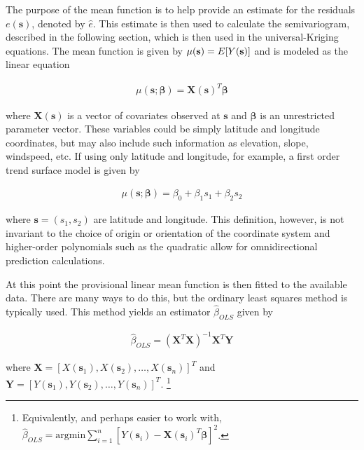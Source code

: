 \documentclass[12pt,twoside]{reedthesis}
\begin{document}
The purpose of the mean function is to help provide an estimate for the residuals $e(\mathbf{s})$, denoted by $\hat e$. This estimate is then used to calculate the semivariogram, described in the following section, which is then used in the universal-Kriging equations. The mean function is given by $\mu(\mathbf{s}) = E[Y(\bold{s})]$ and is modeled as the linear equation

\begin{align*}
\mu(\mathbf{s}; \boldsymbol{\beta}) = \mathbf{X}(\mathbf{s})^T \boldsymbol{\beta}
\end{align*} 

where $\mathbf{X}(\mathbf{s})$ is a vector of covariates observed at $\mathbf{s}$ and $\mathbf{\beta}$ is an unrestricted parameter vector. These variables could be simply latitude and longitude coordinates, but may also include such information as elevation, slope, windspeed, etc. If using only latitude and longitude, for example, a first order  trend surface model is given by

\begin{align*}
\mu(\mathbf{s}; \boldsymbol{\beta}) = \beta_0 + \beta_1s_1 + \beta_2s_2
\end{align*} 

where $\mathbf{s} = (s_1, s_2)$ are latitude and longitude. This definition, however, is not invariant to the choice of origin or orientation of the coordinate system \cite{gelfand:2010} and higher-order polynomials such as the quadratic allow for omnidirectional prediction calculations.


At this point the provisional linear mean function is then fitted to the available data. There are many ways to do this, but the ordinary least squares method is typically used. This method yields an estimator $\hat\beta_{OLS}$ given by 

\begin{align*}
\hat\beta_{OLS} = (\mathbf{X}^T\mathbf{X})^{-1}\mathbf{X}^T\mathbf{Y} 
\end{align*} 

where $\mathbf{X} = [X(\mathbf{s}_1), X(\mathbf{s}_2), \dots, X(\mathbf{s}_n)]^T$ and $\mathbf{Y} = [Y(\mathbf{s}_1), Y(\mathbf{s}_2), \dots, Y(\mathbf{s}_n)]^T$. \footnote{Equivalently, and perhaps easier to work with, $\hat\beta_{OLS} = \text{argmin}\sum_{i=1}^n[Y(\mathbf{s}_i) - \mathbf{X}(\mathbf{s}_i)^T\mathbf{\beta}]^2$.} \\
\end{document}
